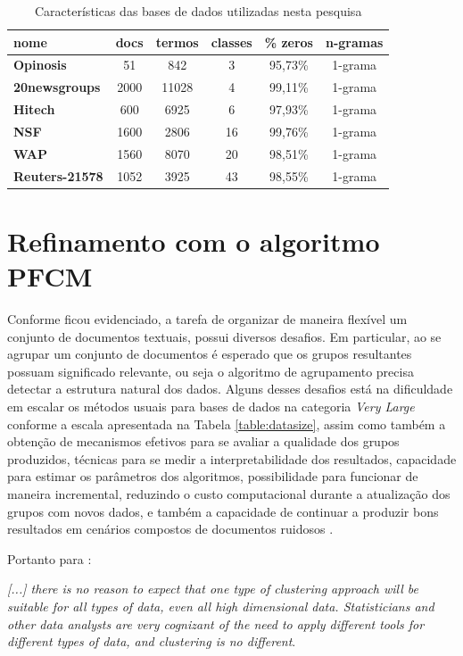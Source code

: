\begin{table}[!htp]
  \centering
  \begin{tabular}{ |l|c c c c c|}
    \hline
    {\bf nome} & docs & termos & classes & \% zeros & n-gramas \\
    \hline
    {\bf Opinosis} & 51 & 842 & 3 & 95,73\% & 1-grama \\
    \hline
    {\bf 20newsgroups} & 2000 & 11028 & 4 & 99,11\% & 1-grama \\
    \hline
    {\bf Hitech} & 600 & 6925 & 6 & 97,93\% & 1-grama \\
    \hline
    {\bf NSF} & 1600 & 2806 & 16 & 99,76\% & 1-grama \\
    \hline
    {\bf WAP} & 1560 & 8070 & 20 & 98,51\% & 1-grama \\
    \hline
    {\bf Reuters-21578} & 1052 & 3925 & 43 & 98,55\% & 1-grama \\
    \hline
  \end{tabular}
  \caption{Características das bases de dados utilizadas nesta pesquisa}
  \label{table:datasets}
\end{table}

\section{Refinamento com o algoritmo PFCM}

Conforme ficou evidenciado, a tarefa de organizar de maneira flexível um conjunto de documentos
textuais, possui diversos desafios. Em particular, ao se agrupar um conjunto de documentos é
esperado que os grupos resultantes possuam significado relevante, ou seja o algoritmo de
agrupamento precisa detectar a estrutura natural dos dados\cite{Steinbach2004}. Alguns desses 
desafios está na dificuldade em escalar os métodos usuais para bases de dados na categoria {\it Very Large}
conforme a escala apresentada na Tabela \ref{table:datasize}, assim como também a obtenção de
mecanismos efetivos para se avaliar a qualidade dos grupos produzidos, técnicas para se medir a
interpretabilidade dos resultados, capacidade para estimar os parâmetros dos algoritmos,
possibilidade para funcionar de maneira incremental, reduzindo o custo computacional durante a
atualização dos grupos com novos dados, e também a capacidade de continuar a produzir bons
resultados em cenários compostos de documentos ruidosos \cite{Carvalho2016}. 

Portanto para :
\begin{citacao}
  {\it [...] there is no reason to expect that one type of clustering approach will
  be suitable for all types of data, even all high dimensional data. Statisticians and other
  data analysts are very cognizant of the need to apply different tools for different types of
  data, and clustering is no different\/}.
\end{citacao}

